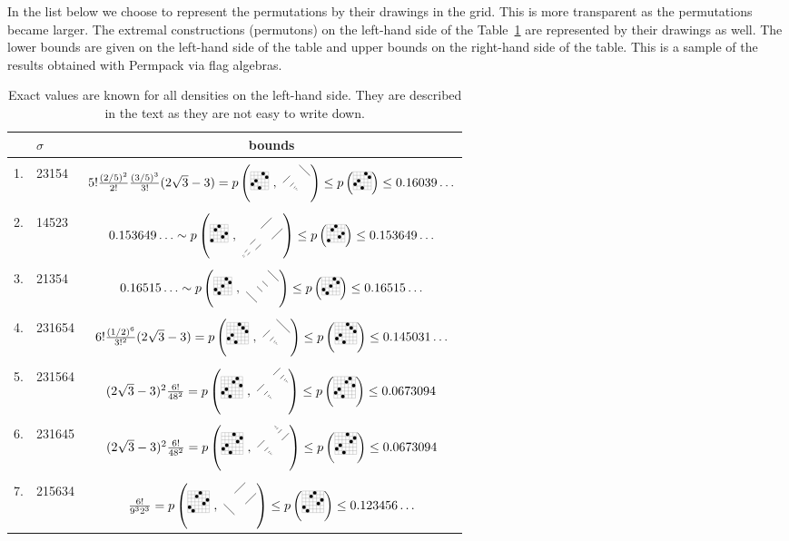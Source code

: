In the list below we choose to represent the permutations by their drawings in the grid. This is more transparent as the permutations became larger. The extremal constructions (permutons) on the left-hand side of the Table~\ref{tab:otherperms} are represented by their drawings as well. The lower bounds are given on the left-hand side of the table and upper bounds on the right-hand side of the table. This is a sample of the results obtained with Permpack via flag algebras.
\begin{table}[ht]
  \centering
  \begin{tabular}{c | l c}
    &$\sigma$ & bounds \\
    \hline\\[-2pt]
    1. & 23154 & $5!\frac{(2/5)^2}{2!}\frac{(3/5)^3}{3!}(2\sqrt{3}-3) = p\left(\bcaoba\ ,\ \Amax\right) \leq p\left(\bcaoba\right) \leq 0.16039\ldots$\\
    \\[-2pt]
    2. & 14523 & $0.153649\ldots \sim p\left(\aobamba\ ,\ \Bmax\right) \leq p\left(\aobamba\right) \leq 0.153649\ldots$\\
    \\[-2pt]
    3. & 21354 & $0.16515\ldots \sim p\left(\baoaoba\ ,\ \Cmax\right) \leq p\left(\baoaoba\right) \leq 0.16515\ldots$\\
    \\[-2pt]
    4. & 231654 & $6!\frac{(1/2)^6}{3!^2}(2\sqrt{3}-3) = p\left(\bcaocba\ ,\ \AAmax\right) \leq p\left(\bcaocba\right) \leq 0.145031\ldots$\\
    \\[-2pt]
    5. & 231564 & $(2\sqrt{3}-3)^2\frac{6!}{48^2} = p\left(\bcaobca\ ,\ \Dmax\right) \leq p\left(\bcaobca\right) \leq 0.0673094$\\
    \\[-2pt]
    6. & 231645 & $(2\sqrt{3}-3)^2\frac{6!}{48^2} = p\left(\bcaocab\ ,\ \Dmaxr\right) \leq p\left(\bcaocab\right) \leq 0.0673094$\\
    \\[-2pt]
    7. & 215634 & $\frac{6!}{9^32^3} = p\left(\baoabmab\ ,\ \Emax\right) \leq p\left(\baoabmab\right) \leq 0.123456\ldots$
\end{tabular}
\caption{\small Exact values are known for all densities on the left-hand side. They are described in the text as they are not easy to write down.}
\label{tab:otherperms}
\end{table}

